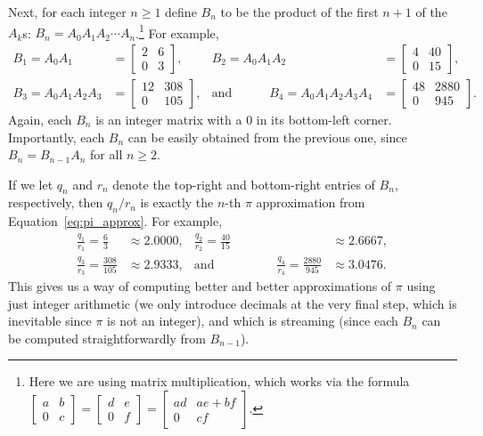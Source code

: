 Next, for each integer $n \geq 1$ define $B_n$ to be the product of the first $n+1$ of the $A_k$s: $B_n = A_0A_1A_2\cdots A_n$.\footnote{Here we are using matrix multiplication, which works via the formula $\begin{bmatrix}a & b \\ 0 & c\end{bmatrix} = \begin{bmatrix}d & e \\ 0 & f\end{bmatrix} = \begin{bmatrix}ad & ae+bf \\ 0 & cf\end{bmatrix}$.} For example,
\begin{align*}
B_1 = A_0A_1 & = \begin{bmatrix}
2 & 6 \\
0 & 3
\end{bmatrix}, & B_2 = A_0A_1A_2 & = \begin{bmatrix}
4 & 40 \\
0 & 15
\end{bmatrix}, \\
B_3 = A_0A_1A_2A_3 & = \begin{bmatrix}
12 & 308 \\
0 & 105
\end{bmatrix}, & \text{and} \qquad\quad B_4 = A_0A_1A_2A_3A_4 & = \begin{bmatrix}
48 & 2880 \\
0 & 945
\end{bmatrix}.
\end{align*}
Again, each $B_n$ is an integer matrix with a $0$ in its bottom-left corner. Importantly, each $B_n$ can be easily obtained from the previous one, since $B_n = B_{n-1}A_n$ for all $n \geq 2$.

If we let $q_n$ and $r_n$ denote the top-right and bottom-right entries of $B_n$, respectively, then $q_n / r_n$ is exactly the $n$-th $\pi$ approximation from Equation~\eqref{eq:pi_approx}. For example,
\begin{align*}
\frac{q_1}{r_1} = \frac{6}{3} & \approx 2.0000, & \frac{q_2}{r_2} = \frac{40}{15} & \approx 2.6667, \\
\frac{q_3}{r_3} = \frac{308}{105} & \approx 2.9333, &  \text{and} \qquad\qquad\quad \frac{q_4}{r_4} = \frac{2880}{945} & \approx 3.0476.
\end{align*}
This gives us a way of computing better and better approximations of $\pi$ using just integer arithmetic (we only introduce decimals at the very final step, which is inevitable since $\pi$ is not an integer), and which is streaming (since each $B_n$ can be computed straightforwardly from $B_{n-1}$).

